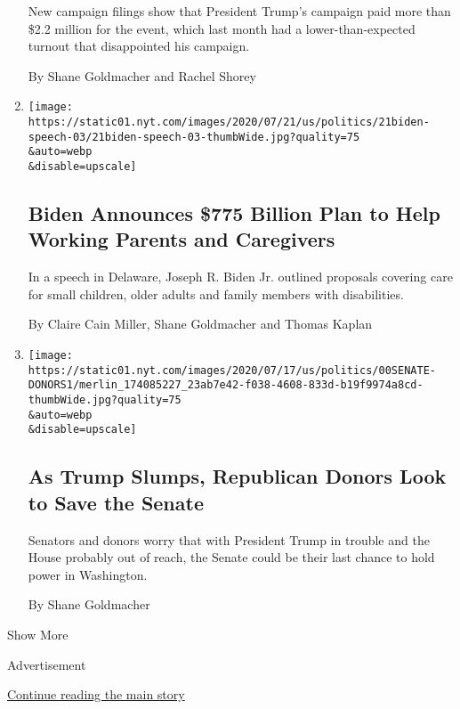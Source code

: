\begin{enumerate}
  New campaign filings show that President Trump's campaign paid more
  than \$2.2 million for the event, which last month had a
  lower-than-expected turnout that disappointed his campaign.

  By Shane Goldmacher and Rachel Shorey
\item
  \href{/2020/07/21/us/politics/biden-workplace-childcare.html}{}

  \texttt{[image: https://static01.nyt.com/images/2020/07/21/us/politics/21biden-speech-03/21biden-speech-03-thumbWide.jpg?quality=75\\\&auto=webp\\\&disable=upscale]}

  \hypertarget{biden-announces-775-billion-plan-to-help-working-parents-and-caregivers}{%
  \subsection{Biden Announces \$775 Billion Plan to Help Working Parents
  and
  Caregivers}\label{biden-announces-775-billion-plan-to-help-working-parents-and-caregivers}}

  In a speech in Delaware, Joseph R. Biden Jr. outlined proposals
  covering care for small children, older adults and family members with
  disabilities.

  By Claire Cain Miller, Shane Goldmacher and Thomas Kaplan
\item
  \href{/2020/07/20/us/politics/trump-polls-senate.html}{}

  \texttt{[image: https://static01.nyt.com/images/2020/07/17/us/politics/00SENATE-DONORS1/merlin\_174085227\_23ab7e42-f038-4608-833d-b19f9974a8cd-thumbWide.jpg?quality=75\\\&auto=webp\\\&disable=upscale]}

  \hypertarget{as-trump-slumps-republican-donors-look-to-save-the-senate}{%
  \subsection{As Trump Slumps, Republican Donors Look to Save the
  Senate}\label{as-trump-slumps-republican-donors-look-to-save-the-senate}}

  Senators and donors worry that with President Trump in trouble and the
  House probably out of reach, the Senate could be their last chance to
  hold power in Washington.

  By Shane Goldmacher
\end{enumerate}

Show More

Advertisement

\protect\hyperlink{after-mid2}{Continue reading the main story}


